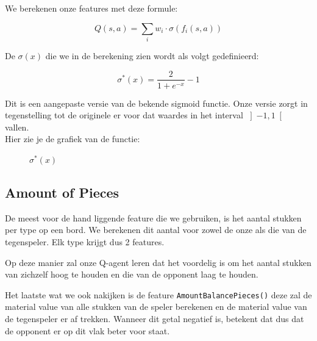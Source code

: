 \documentclass[a4paper,openany]{uantwerpenassignment}
\newcommand{\codeword}[1]{
    \colorbox{code}{\texttt{\textcolor{codetext}{#1}}}
}
\begin{document}
We berekenen onze features met deze formule:

$$
Q(s,a) = \sum_{i} w_{i} \cdot \sigma \left( f_i(s, a)\right)
$$

De $\sigma(x)$ die we in de berekening zien wordt als volgt gedefinieerd:

$$
\sigma^*(x) = \frac{2}{1 + e^{-x}} - 1
$$

Dit is een aangepaste versie van de bekende sigmoid\cite{WSF} functie. Onze versie zorgt in tegenstelling tot de originele er voor dat waardes in het interval $\left]-1,1\right[$ vallen.\\
Hier zie je de grafiek van de functie:

\begin{figure}[h]
    \centering
    \caption{$\sigma^*(x)$} \label{fig:sigmoid}
\end{figure}



\subsection{Amount of Pieces}
De meest voor de hand liggende feature die we gebruiken, is het aantal stukken per type op een bord. We berekenen dit aantal voor zowel de onze als die van de tegenspeler. Elk type krijgt dus 2 features.

Op deze manier zal onze Q-agent leren dat het voordelig is om het aantal stukken van zichzelf hoog te houden en die van de opponent laag te houden.

Het laatste wat we ook nakijken is de feature \codeword{AmountBalancePieces()} deze zal de material value van alle stukken van de speler berekenen en de material value van de tegenspeler er af trekken. Wanneer dit getal negatief is, betekent dat dus dat de opponent er op dit vlak beter voor staat.
\end{document}
